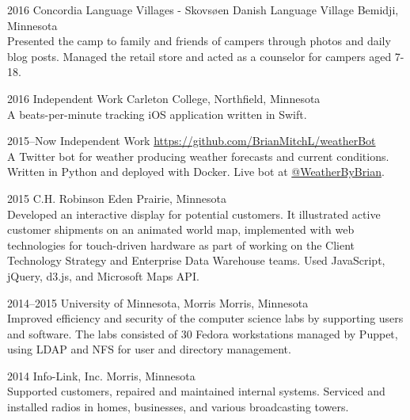\documentclass[]{cv-style} %
\begin{document}
\begin{entrylist}
\entry
{2016}
{Concordia Language Villages - Skovsøen Danish Language Village}
{Bemidji, Minnesota}
{ \\
Presented the camp to family and friends of campers through photos and daily blog posts.  Managed the retail store and acted as a counselor for campers aged 7-18.}


\entry
{2016}
{Independent Work}
{Carleton College, Northfield, Minnesota}
{ \\
A beats-per-minute tracking iOS application written in Swift.}


\entry
{2015--Now}
{Independent Work}
{\href{https://github.com/BrianMitchL/weatherBot}{https://github.com/BrianMitchL/weatherBot}}
{ \\
A Twitter bot for weather producing weather forecasts and current conditions. Written in Python and deployed with Docker. Live bot at \href{https://twitter.com/WeatherByBrian}{@WeatherByBrian}.}


\entry
{2015}
{C.H. Robinson}
{Eden Prairie, Minnesota}
{ \\
Developed an interactive display for potential customers. It illustrated active customer shipments on an animated world map, implemented with web technologies for touch-driven hardware as part of working on the Client Technology Strategy and Enterprise Data Warehouse teams. Used JavaScript, jQuery, d3.js, and Microsoft Maps API.}


\entry
{2014--2015}
{University of Minnesota, Morris}
{Morris, Minnesota}
{ \\
Improved efficiency and security of the computer science labs by supporting users and software. The labs consisted of 30 Fedora workstations managed by Puppet, using LDAP and NFS for user and directory management.}


\entry
{2014}
{Info-Link, Inc.}
{Morris, Minnesota}
{ \\
Supported customers, repaired and maintained internal systems. Serviced and installed radios in homes, businesses, and various broadcasting towers.}


\end{entrylist}
\end{document}
